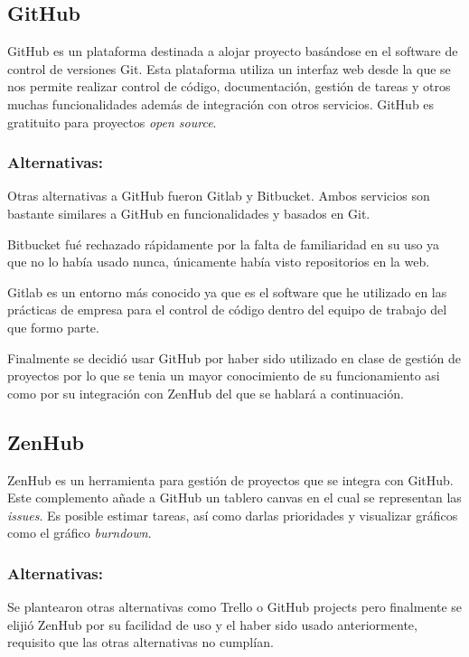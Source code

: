 \subsection{GitHub}\label{GitHub}
GitHub es un plataforma destinada a alojar proyecto basándose en el software de control de versiones Git. Esta plataforma utiliza un interfaz web desde la que se nos permite realizar control de código, documentación, gestión de tareas y otros muchas funcionalidades además de integración con otros servicios. GitHub es gratituito para proyectos \emph{open source}. \cite{}

\subsubsection{Alternativas:}\label{AlternativasGitHub}
Otras alternativas a GitHub fueron Gitlab y Bitbucket. Ambos servicios son bastante similares a GitHub en funcionalidades y basados en Git.

Bitbucket fué rechazado rápidamente por la falta de familiaridad en su uso ya que no lo había usado nunca, únicamente había visto repositorios en la web.

Gitlab es un entorno más conocido ya que es el software que he utilizado en las prácticas de empresa para el control de código dentro del equipo de trabajo del que formo parte.

Finalmente se decidió usar GitHub por haber sido utilizado en clase de gestión de proyectos por lo que se tenia un mayor conocimiento de su funcionamiento asi como por su integración con ZenHub del que se hablará a continuación.

\subsection{ZenHub}\label{ZenHub}
ZenHub es un herramienta para gestión de proyectos que se integra con GitHub. Este complemento añade a GitHub un tablero canvas en el cual se representan las \emph{issues}. Es posible estimar tareas, así como darlas prioridades y visualizar gráficos como el gráfico \emph{burndown}. \cite{}

\subsubsection{Alternativas:}\label{AlternativasZotero}
Se plantearon otras alternativas como Trello o GitHub projects pero finalmente se elijió  ZenHub por su facilidad de uso y el haber sido usado anteriormente, requisito que las otras alternativas no cumplían.

